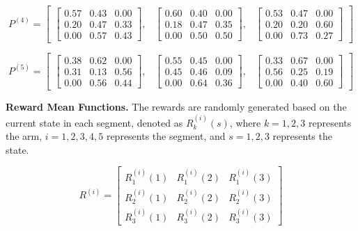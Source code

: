 \documentclass[twoside]{article}
\theoremstyle{plain}
\theoremstyle{definition}
\theoremstyle{remark}
\begin{document}
\begin{equation}
P^{(4)} =
\begin{bmatrix}
\begin{bmatrix} 0.57 & 0.43 & 0.00 \\ 0.20 & 0.47 & 0.33 \\ 0.00 & 0.57 & 0.43 \end{bmatrix}, &
\begin{bmatrix} 0.60 & 0.40 & 0.00 \\ 0.18 & 0.47 & 0.35 \\ 0.00 & 0.50 & 0.50 \end{bmatrix}, &
\begin{bmatrix} 0.53 & 0.47 & 0.00 \\ 0.20 & 0.20 & 0.60 \\ 0.00 & 0.73 & 0.27 \end{bmatrix}
\end{bmatrix}
\end{equation}

\begin{equation}
P^{(5)} =
\begin{bmatrix}
\begin{bmatrix} 0.38 & 0.62 & 0.00 \\ 0.31 & 0.13 & 0.56 \\ 0.00 & 0.56 & 0.44 \end{bmatrix}, &
\begin{bmatrix} 0.55 & 0.45 & 0.00 \\ 0.45 & 0.46 & 0.09 \\ 0.00 & 0.64 & 0.36 \end{bmatrix}, &
\begin{bmatrix} 0.33 & 0.67 & 0.00 \\ 0.56 & 0.25 & 0.19 \\ 0.00 & 0.40 & 0.60 \end{bmatrix}
\end{bmatrix}
\end{equation}

\textbf{Reward Mean Functions.} The rewards are randomly generated based on the current state in each segment, denoted as $R^{(i)}_k(s)$, where $k=1,2,3$ represents the arm, $i=1,2,3,4,5$ represents the segment, and $s=1,2,3$ represents the state. 

\begin{equation}
R^{(i)} =
\begin{bmatrix}
R^{(i)}_1(1) & R^{(i)}_1(2) & R^{(i)}_1(3) \\
R^{(i)}_2(1) & R^{(i)}_2(2) & R^{(i)}_2(3) \\
R^{(i)}_3(1) & R^{(i)}_3(2) & R^{(i)}_3(3)
\end{bmatrix}
\end{equation}
\end{document}
